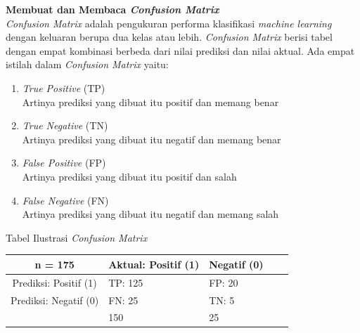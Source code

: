 \documentclass{report}
\begin{document}
\vspace{0.5cm}

{\bf Membuat dan Membaca \emph{Confusion Matrix}}
\vspace{0.1cm}
\\\hangindent=0.5cm \emph{Confusion Matrix} adalah pengukuran performa klasifikasi \emph{machine learning} dengan keluaran berupa dua kelas atau lebih. \emph{Confusion Matrix} berisi tabel dengan empat kombinasi berbeda dari nilai prediksi dan nilai aktual. Ada empat istilah dalam \emph{Confusion Matrix} yaitu:

\begin{enumerate}
  \item \emph{True Positive} (TP)
   \\\hangindent=0.5cm Artinya prediksi yang dibuat itu positif dan memang benar
  
  \item \emph{True Negative} (TN)
   \\\hangindent=0.5cm Artinya prediksi yang dibuat itu negatif dan memang benar
   
  \item \emph{False Positive} (FP)
   \\\hangindent=0.5cm Artinya prediksi yang dibuat itu positif dan salah
   
  \item \emph{False Negative} (FN)
   \\\hangindent=0.5cm Artinya prediksi yang dibuat itu negatif dan memang salah
   
\end{enumerate}

\vspace{0.4cm}
\begin{center}
Tabel Ilustrasi \emph{Confusion Matrix} 
\begin{table}[h!]
\centering
\begin{tabular}{|c|l|l|l|l|} %
\hline %
n = 175 & Aktual: Positif (1) &  Negatif (0) \\
\hline %
Prediksi: Positif (1)   & TP: 125 & FP: 20\\
\hline 
Prediksi: Negatif (0)   & FN: 25 & TN: 5\\
\hline 
   & 150 & 25\\
\hline %
\end{tabular}
\end{table}
\end{center}
\end{document}
